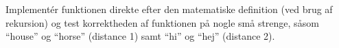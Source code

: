   Implement\'{e}r funktionen  direkte efter den matematiske
  definition (ved brug af rekursion) og test korrektheden af funktionen på nogle små
  strenge, såsom ``house'' og ``horse'' (distance 1) samt ``hi'' og ``hej'' (distance 2).